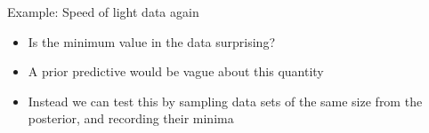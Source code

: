 \begin{frame}{Example: Speed of light data again}
  \begin{itemize}
    \item Is the minimum value in the data surprising?
    \vspace{\baselineskip}
    \pause
    \item A prior predictive would be vague about this quantity
    \vspace{\baselineskip}
    \pause
    \item Instead we can test this by sampling data sets of the same size from the posterior, and recording their minima
    \pause
  \end{itemize}
  \begin{center}
  \end{center}
\end{frame}

